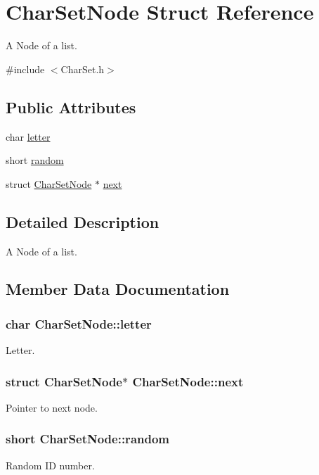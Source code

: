 \hypertarget{structCharSetNode}{\section{Char\-Set\-Node Struct Reference}
\label{structCharSetNode}
}


A Node of a list.  




{\ttfamily \#include $<$Char\-Set.\-h$>$}

\subsection*{Public Attributes}
\begin{DoxyCompactItemize}
\item 
char \hyperlink{structCharSetNode_ad3739fe286dc2d93ee95ff6b63827e81}{letter}
\item 
short \hyperlink{structCharSetNode_aed6ff329fcdc81a760dba221c5e204e4}{random}
\item 
struct \hyperlink{structCharSetNode}{Char\-Set\-Node} $\ast$ \hyperlink{structCharSetNode_ab28e14aba278736d1f5d11cfb41ea468}{next}
\end{DoxyCompactItemize}


\subsection{Detailed Description}
A Node of a list. 

\subsection{Member Data Documentation}
\hypertarget{structCharSetNode_ad3739fe286dc2d93ee95ff6b63827e81}{
\subsubsection[{letter}]{\setlength{\rightskip}{0pt plus 5cm}char Char\-Set\-Node\-::letter}}\label{structCharSetNode_ad3739fe286dc2d93ee95ff6b63827e81}
Letter. \hypertarget{structCharSetNode_ab28e14aba278736d1f5d11cfb41ea468}{
\subsubsection[{next}]{\setlength{\rightskip}{0pt plus 5cm}struct {\bf Char\-Set\-Node}$\ast$ Char\-Set\-Node\-::next}}\label{structCharSetNode_ab28e14aba278736d1f5d11cfb41ea468}
Pointer to next node. \hypertarget{structCharSetNode_aed6ff329fcdc81a760dba221c5e204e4}{
\subsubsection[{random}]{\setlength{\rightskip}{0pt plus 5cm}short Char\-Set\-Node\-::random}}\label{structCharSetNode_aed6ff329fcdc81a760dba221c5e204e4}
Random I\-D number. 

